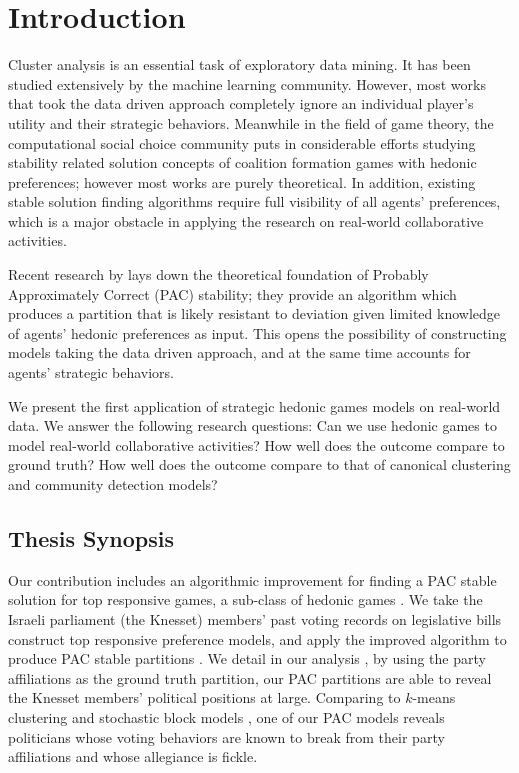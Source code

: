 
\chapter{Introduction}

Cluster analysis is an essential task of exploratory data mining.
It has been studied extensively by the machine learning community.
However, most works that took the data driven approach completely ignore an individual player's utility and their strategic behaviors.
Meanwhile in the field of game theory, the computational social choice community puts in considerable efforts studying stability related solution concepts of coalition formation games with hedonic preferences;
however most works are purely theoretical.
In addition, existing stable solution finding algorithms require full visibility of all agents' preferences, which is a major obstacle in applying the research on real-world collaborative activities.

Recent research by  lays down the theoretical foundation of Probably Approximately Correct (PAC) stability;
they provide an algorithm which produces a partition that is likely resistant to deviation given limited knowledge of agents' hedonic preferences as input.
This opens the possibility of constructing models taking the data driven approach, and at the same time accounts for agents' strategic behaviors.

We present the first application of strategic hedonic games models on real-world data.
We answer the following research questions: Can we use hedonic games to model real-world collaborative activities?
How well does the outcome compare to ground truth?
How well does the outcome compare to that of canonical clustering and community detection models?


\section{Thesis Synopsis}
Our contribution includes an algorithmic improvement for finding a PAC stable solution for top responsive games, a sub-class of hedonic games
.  We take the Israeli parliament (the Knesset) members' past voting records on legislative bills 
construct top responsive preference models, and apply the improved algorithm to produce PAC stable partitions
.  We detail in our analysis 
, by using the party affiliations as the ground truth partition,
our PAC partitions are able to reveal the Knesset members' political positions at large. 
Comparing to $k$-means clustering and stochastic block models 
, one of our PAC models reveals politicians whose voting behaviors are known to break from their party affiliations and whose allegiance is fickle.

